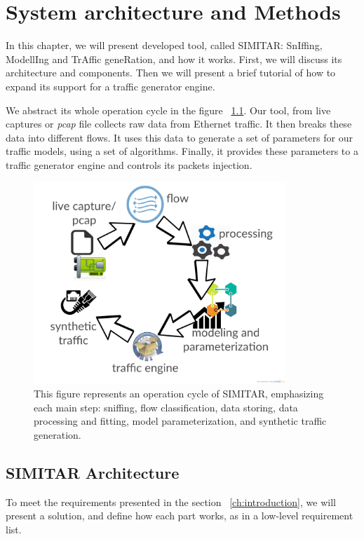 \chapter{System architecture and Methods}\label{ch:architecture}


In this chapter, we will present developed tool, called SIMITAR: SnIffing, ModellIng and TrAffic geneRation, and how it works. First, we will discuss its architecture and components. Then we will present a brief tutorial of how to expand its support for a traffic generator engine. 

We abstract its whole operation cycle in the figure ~\ref{fig:cycle-of-operation}. Our tool, from live captures or \textit{pcap} file collects raw data from Ethernet traffic. It then breaks these data into different flows. It uses this data to generate a set of parameters for our traffic models, using a set of algorithms. Finally, it provides these parameters to a traffic generator engine and controls its packets injection.

\begin{figure}[ht!]
        \centering
        \includegraphics[height=3.0in]{figures/ch3/digram-project-cycle}
        \caption{This figure represents an operation cycle of SIMITAR, emphasizing each main step: sniffing, flow classification, data storing, data processing and fitting, model parameterization,  and synthetic traffic generation.}
    \label{fig:cycle-of-operation}
\end{figure}


\section{SIMITAR Architecture}

To meet the requirements presented in the section ~\ref{ch:introduction}, we will present a solution, and define how each part works, as in a low-level requirement list\cite{sommerville}.  

